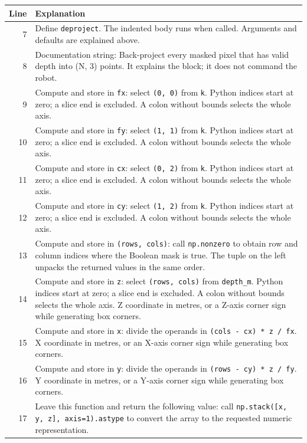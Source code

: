 \documentclass[11pt,a4paper]{book}
\begin{document}
\begin{longtable}{r p{}}

\textbf{Line} & \textbf{Explanation} \\ \hline \endhead

7 & Define \texttt{deproject}. The indented body runs when called. Arguments and defaults are explained above. \\

8 & Documentation string: Back-project every masked pixel that has valid depth into (N, 3) points. It explains the block; it does not command the robot. \\

9 & Compute and store in \texttt{fx}: select \texttt{(0, 0)} from \texttt{k}. Python indices start at zero; a slice end is excluded. A colon without bounds selects the whole axis.  \\

10 & Compute and store in \texttt{fy}: select \texttt{(1, 1)} from \texttt{k}. Python indices start at zero; a slice end is excluded. A colon without bounds selects the whole axis.  \\

11 & Compute and store in \texttt{cx}: select \texttt{(0, 2)} from \texttt{k}. Python indices start at zero; a slice end is excluded. A colon without bounds selects the whole axis.  \\

12 & Compute and store in \texttt{cy}: select \texttt{(1, 2)} from \texttt{k}. Python indices start at zero; a slice end is excluded. A colon without bounds selects the whole axis.  \\

13 & Compute and store in \texttt{(rows, cols)}: call \texttt{np.nonzero} to obtain row and column indices where the Boolean mask is true. The tuple on the left unpacks the returned values in the same order. \\

14 & Compute and store in \texttt{z}: select \texttt{(rows, cols)} from \texttt{depth\_m}. Python indices start at zero; a slice end is excluded. A colon without bounds selects the whole axis. Z coordinate in metres, or a Z-axis corner sign while generating box corners. \\

15 & Compute and store in \texttt{x}: divide the operands in \texttt{(cols - cx) * z / fx}. X coordinate in metres, or an X-axis corner sign while generating box corners. \\

16 & Compute and store in \texttt{y}: divide the operands in \texttt{(rows - cy) * z / fy}. Y coordinate in metres, or a Y-axis corner sign while generating box corners. \\

17 & Leave this function and return the following value: call \texttt{np.stack([x, y, z], axis=1).astype} to convert the array to the requested numeric representation. \\

\end{longtable}
\end{document}
